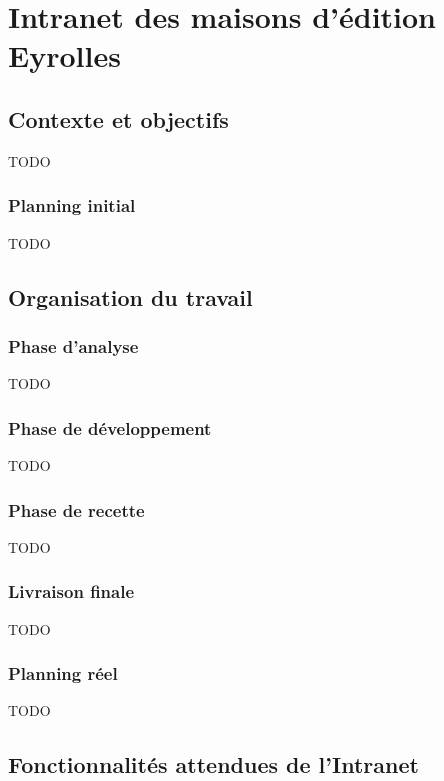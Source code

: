 \section{Intranet des maisons d'édition Eyrolles}

\subsection{Contexte et objectifs}

TODO

\subsubsection{Planning initial}

TODO

\subsection{Organisation du travail}

\subsubsection{Phase d'analyse}

TODO

\subsubsection{Phase de développement}

TODO

\subsubsection{Phase de recette}

TODO

\subsubsection{Livraison finale}

TODO

\subsubsection{Planning réel}

TODO

\subsection{Fonctionnalités attendues de l'Intranet}

